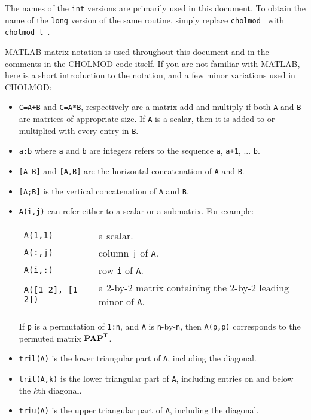 \documentclass[11pt]{article}
\newcommand{\m}[1]{{\bf{#1}}}       %
\newcommand{\tr}{^{\sf T}}          %
\begin{document}
The names of the {\tt int} versions are primarily used in this document.
To obtain the name of the {\tt long} version of the same routine, simply
replace {\tt cholmod\_} with {\tt cholmod\_l\_}.

MATLAB matrix notation is used throughout this document and in
the comments in the CHOLMOD code itself.  If you are not familiar with
MATLAB, here is a short introduction to the notation, and a few
minor variations used in CHOLMOD:

\begin{itemize}
    \item {\tt C=A+B} and {\tt C=A*B}, respectively are a matrix add and multiply if both
	{\tt A} and {\tt B} are matrices of appropriate size.  If {\tt A} is
	a scalar, then it is added to or multiplied with every entry in {\tt B}.
    \item {\tt a:b} where {\tt a} and {\tt b} are integers refers to the
	sequence {\tt a}, {\tt a+1}, ... {\tt b}.
    \item {\tt [A B]} and {\tt [A,B]} are the horizontal concatenation of {\tt A} and {\tt B}.
    \item {\tt [A;B]} is the vertical concatenation of {\tt A} and {\tt B}.
    \item {\tt A(i,j)} can refer either to a scalar or a submatrix.
	For example: \newline
	\vspace{0.05in}
	\begin{tabular}{ll}
	\hline
	{\tt A(1,1)} & a scalar. \\
	{\tt A(:,j)} & column {\tt j} of {\tt A}. \\
	{\tt A(i,:)} & row {\tt i} of {\tt A}. \\
	{\tt A([1 2], [1 2])} & a 2-by-2 matrix containing the 2-by-2 leading minor of {\tt A}. \\
	\hline
	\end{tabular} \newline
	\vspace{0.1in}
	If {\tt p} is a permutation of {\tt 1:n}, and {\tt A} is {\tt n}-by-{\tt n},
	then {\tt A(p,p)} corresponds to the permuted matrix $\m{PAP}\tr$.
    \item {\tt tril(A)} is the lower triangular part of {\tt A}, including the diagonal.
    \item {\tt tril(A,k)} is the lower triangular part of {\tt A}, including entries
	on and below the $k$th diagonal.
    \item {\tt triu(A)} is the upper triangular part of {\tt A}, including the diagonal.

\end{itemize}
\end{document}
